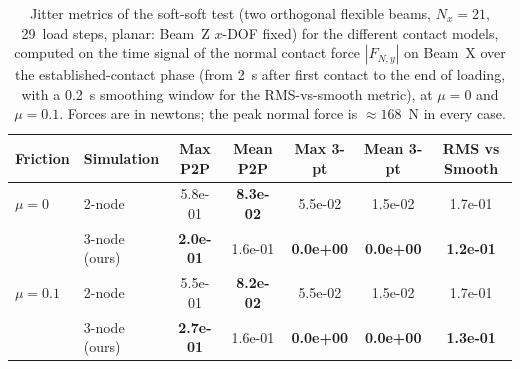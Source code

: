 \begin{table}[ht]
    \centering
    \small
    \caption{Jitter metrics of the soft-soft test (two orthogonal flexible beams, $N_x = 21$, 29~load steps, planar: Beam~Z $x$-DOF fixed) for the different contact models, computed on the time signal of the normal contact force $|F_{N,y}|$ on Beam~X over the established-contact phase (from 2~s after first contact to the end of loading, with a 0.2~s smoothing window for the RMS-vs-smooth metric), at $\mu = 0$ and $\mu = 0.1$. Forces are in newtons; the peak normal force is $\approx 168$~N in every case.}
    \label{tab:metrics_jitter_soft_soft}
    \begin{tabular}{llccccc}
        \toprule
        Friction & Simulation & Max P2P & Mean P2P & Max 3-pt & Mean 3-pt & RMS vs Smooth \\
        \midrule
        $\mu = 0$ & 2-node & 5.8e-01 & \textbf{8.3e-02} & 5.5e-02 & 1.5e-02 & 1.7e-01 \\
         & 3-node (ours) & \textbf{2.0e-01} & 1.6e-01 & \textbf{0.0e+00} & \textbf{0.0e+00} & \textbf{1.2e-01} \\
        \midrule
        $\mu = 0.1$ & 2-node & 5.5e-01 & \textbf{8.2e-02} & 5.5e-02 & 1.5e-02 & 1.7e-01 \\
         & 3-node (ours) & \textbf{2.7e-01} & 1.6e-01 & \textbf{0.0e+00} & \textbf{0.0e+00} & \textbf{1.3e-01} \\
        \bottomrule
    \end{tabular}
\end{table}
